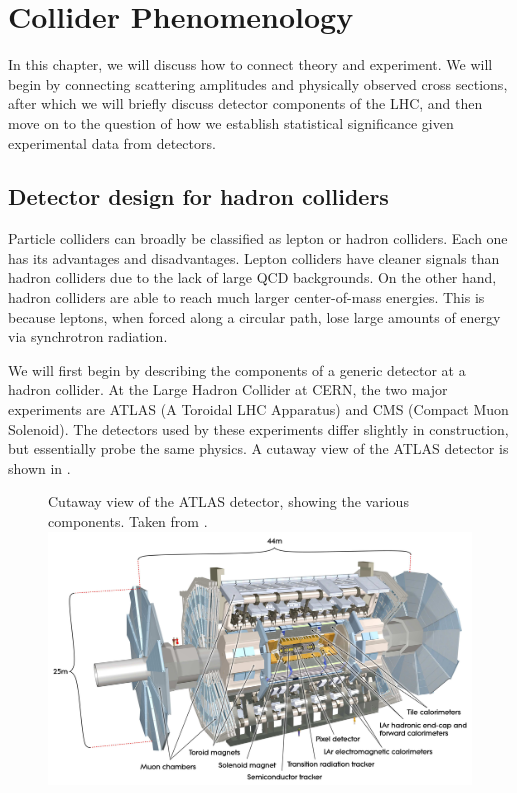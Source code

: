 \chapter{Collider Phenomenology}
In this chapter, we will discuss how to connect theory and experiment. We will begin by connecting scattering amplitudes and physically observed cross sections, after which we will briefly discuss detector components of the LHC, and then move on to the question of how we establish statistical significance given experimental data from detectors.
\section{Detector design for hadron colliders}
Particle colliders can broadly be classified as lepton or hadron colliders. Each one has its advantages and disadvantages. Lepton colliders have cleaner signals than hadron colliders due to the lack of large QCD backgrounds. On the other hand, hadron colliders are able to reach much larger center-of-mass energies. This is because leptons, when forced along a circular path, lose large amounts of energy via synchrotron radiation.

We will first begin by describing the components of a generic detector at a hadron collider. At the Large Hadron Collider at CERN, the two major experiments are ATLAS (A Toroidal LHC Apparatus) and CMS (Compact Muon Solenoid). The detectors used by these experiments differ slightly in construction, but essentially probe the same physics. A cutaway view of the ATLAS detector is shown in \label{fig:ATLAS_cutaway}.

\begin{figure}[h]
  \begin{sidecaption}
    { Cutaway view of the ATLAS detector, showing the various components. Taken from \citep{Atlas2008}.}
    \centering
  \includegraphics[trim = {2cm 5cm 2cm 2cm}, clip, width=1\textwidth]{images/atlas}
  \end{sidecaption}
  \label{fig:ATLAS_cutaway}
\end{figure}


